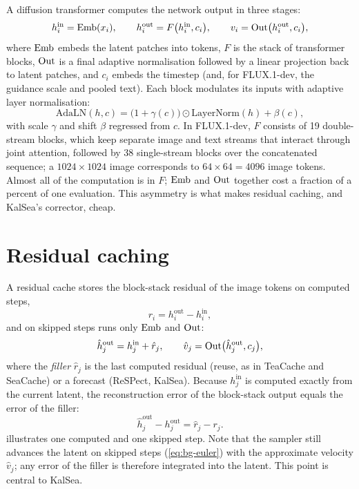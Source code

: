 A diffusion transformer \citep{peebles2023dit} computes the network output in three stages:
\begin{equation}\label{eq:bg-stages}
  h^{\mathrm{in}}_i = \mathrm{Emb}(x_i), \qquad h^{\mathrm{out}}_i = F\big(h^{\mathrm{in}}_i, c_i\big), \qquad v_i = \mathrm{Out}\big(h^{\mathrm{out}}_i, c_i\big),
\end{equation}
where $\mathrm{Emb}$ embeds the latent patches into tokens, $F$ is the stack of transformer blocks, $\mathrm{Out}$ is a final adaptive normalisation followed by a linear projection back to latent patches, and $c_i$ embeds the timestep (and, for FLUX.1-dev, the guidance scale and pooled text). Each block modulates its inputs with adaptive layer normalisation:
\begin{equation}\label{eq:bg-adaln}
  \mathrm{AdaLN}(h, c) = \big(1+\gamma(c)\big)\odot\mathrm{LayerNorm}(h) + \beta(c),
\end{equation}
with scale $\gamma$ and shift $\beta$ regressed from $c$. In FLUX.1-dev, $F$ consists of 19 double-stream blocks, which keep separate image and text streams that interact through joint attention, followed by 38 single-stream blocks over the concatenated sequence; a $1024\times1024$ image corresponds to $64\times 64 = 4096$ image tokens. Almost all of the computation is in $F$; $\mathrm{Emb}$ and $\mathrm{Out}$ together cost a fraction of a percent of one evaluation. This asymmetry is what makes residual caching, and KalSea's corrector, cheap.

\section{Residual caching}\label{sec:bg-residual}

A residual cache stores the block-stack residual of the image tokens on computed steps,
\begin{equation}\label{eq:bg-residual}
  r_i = h^{\mathrm{out}}_i - h^{\mathrm{in}}_i ,
\end{equation}
and on skipped steps runs only $\mathrm{Emb}$ and $\mathrm{Out}$:
\begin{equation}\label{eq:bg-skip}
  \hat h^{\mathrm{out}}_j = h^{\mathrm{in}}_j + \hat r_j, \qquad \hat v_j = \mathrm{Out}\big(\hat h^{\mathrm{out}}_j, c_j\big),
\end{equation}
where the \emph{filler} $\hat r_j$ is the last computed residual (reuse, as in TeaCache and SeaCache) or a forecast (ReSPect, KalSea). Because $h^{\mathrm{in}}_j$ is computed exactly from the current latent, the reconstruction error of the block-stack output equals the error of the filler:
\begin{equation}\label{eq:bg-error}
  \hat h^{\mathrm{out}}_j - h^{\mathrm{out}}_j = \hat r_j - r_j .
\end{equation}
 illustrates one computed and one skipped step. Note that the sampler still advances the latent on skipped steps (\cref{eq:bg-euler}) with the approximate velocity $\hat v_j$; any error of the filler is therefore integrated into the latent. This point is central to KalSea.


